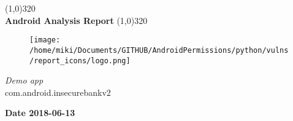 \documentclass[12p]{article}
\begin{document}
\begin{titlepage}
\begin{center}
\line(1,0){320}\\
[0.25in]
\huge{\bfseries Android Analysis Report}
\line(1,0){320}\\
[0.5in]
\begin{figure}[H]
	\centering
	\texttt{[image: /home/miki/Documents/GITHUB/AndroidPermissions/python/vulns/report\_icons/logo.png]}
\end{figure}
\textsl{\LARGE Demo app}\\
\textsf{\LARGE com.android.insecurebankv2}\\
[2.5in]
\end{center}
\begin{flushright}
\textbf{\large Date 2018-06-13}
\end{flushright}
\end{titlepage}
\tableofcontents
\thispagestyle{empty}
\cleardoublepage
\setcounter{page}{1}
\end{document}
